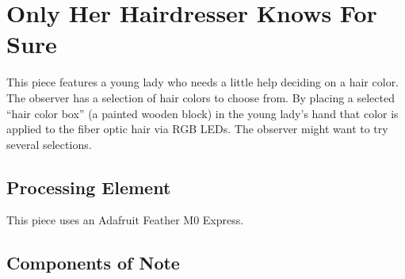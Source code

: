 %
%
%
%
% 
%
%
%
%
%
% 
%

\section{Only Her Hairdresser Knows For Sure}

This piece features a young lady who needs a little help deciding on a hair 
color.  The observer has a selection of hair colors to choose from.  By 
placing a selected ``hair color box'' (a painted wooden block) in the young 
lady's hand that color is applied to the fiber optic hair via RGB LEDs. The 
observer might want to try several selections.

\subsection*{Processing Element} 

This piece uses an Adafruit Feather M0 Express.

\subsection*{Components of Note}

